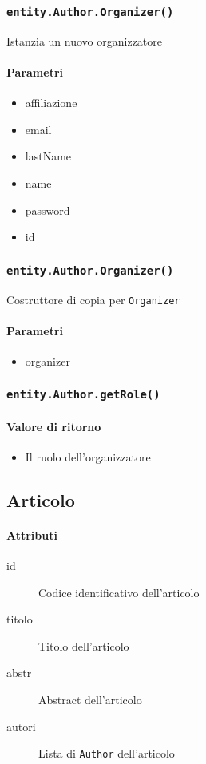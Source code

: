 \subsubsection{\texttt{entity.Author.Organizer()}}
Istanzia un nuovo organizzatore
\paragraph{Parametri}
\begin{itemize}
\item affiliazione
\item email
\item lastName
\item name
\item password
\item id
\end{itemize}

\subsubsection{\texttt{entity.Author.Organizer()}}
Costruttore di copia per \texttt{Organizer}
\paragraph{Parametri}
\begin{itemize}
\item organizer
\end{itemize}

\subsubsection{\texttt{entity.Author.getRole()}}
\paragraph{Valore di ritorno}
\begin{itemize}
\item Il ruolo dell'organizzatore
\end{itemize}

\subsection{Articolo}
\paragraph{Attributi}
\begin{description}
\item [id] Codice identificativo dell'articolo
\item[titolo] Titolo dell'articolo
\item[abstr]  Abstract dell'articolo
\item[autori] Lista di \texttt{Author} dell'articolo
\end{description}

